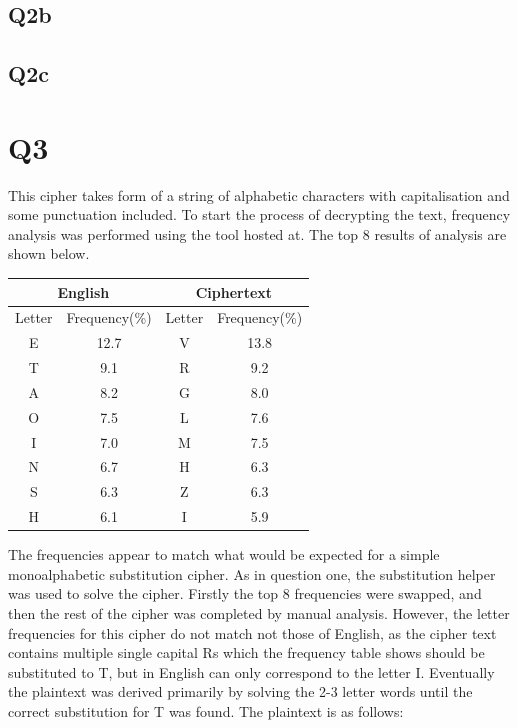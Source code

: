 \documentclass[pdflatex, a4paper,12pt]{article}
\begin{document}
\subsection{Q2b}



\subsection{Q2c}


\section{Q3}

This cipher takes form of a string of alphabetic characters with capitalisation
and some punctuation included. To start the process of decrypting the text, frequency
analysis was performed using the tool hosted at\cite{_monoalphabetic_????}. The top 8 results of
analysis are shown below.

\begin{center}
\begin{tabular}{cc|cc}
    \multicolumn{2}{c|}{English} & \multicolumn{2}{c}{Ciphertext} \\
    \hline
    Letter & Frequency(\%) & Letter & Frequency(\%) \\
    \hline
    E                & 12.7         & V      & 13.8  \\
    T                & 9.1          & R      & 9.2   \\
    A                & 8.2          & G      & 8.0   \\
    O                & 7.5          & L      & 7.6   \\
    I                & 7.0          & M      & 7.5   \\
    N                & 6.7          & H      & 6.3   \\
    S                & 6.3          & Z      & 6.3   \\
    H                & 6.1          & I      & 5.9   \\
\end{tabular}
\end{center}

The frequencies appear to match what would be expected for a simple
monoalphabetic substitution cipher. As in question one, the substitution helper
was used to solve the cipher.
Firstly the top 8 frequencies were swapped, and then the rest of the cipher was
completed by manual analysis. However, the letter frequencies for this cipher
do not match not those of English, as the cipher text contains multiple single capital
Rs which the frequency table shows should be substituted to T, but in English
can only correspond to the letter I. Eventually the plaintext was derived
primarily by solving the 2-3 letter words until the correct substitution for T
was found. The plaintext is as follows:
\end{document}
